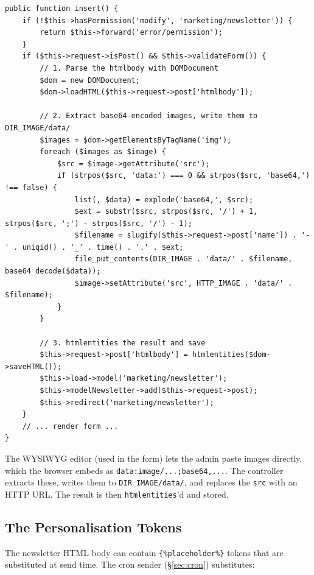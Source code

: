 \documentclass[11pt,a4paper]{article}
\begin{document}
\begin{lstlisting}[caption={\texttt{ControllerMarketingNewsletter::insert()} --- newsletter creation with base64 image extraction (abridged).},label={lst:newsletter-insert}]
public function insert() {
    if (!$this->hasPermission('modify', 'marketing/newsletter')) {
        return $this->forward('error/permission');
    }
    if ($this->request->isPost() && $this->validateForm()) {
        // 1. Parse the htmlbody with DOMDocument
        $dom = new DOMDocument;
        $dom->loadHTML($this->request->post['htmlbody']);

        // 2. Extract base64-encoded images, write them to DIR_IMAGE/data/
        $images = $dom->getElementsByTagName('img');
        foreach ($images as $image) {
            $src = $image->getAttribute('src');
            if (strpos($src, 'data:') === 0 && strpos($src, 'base64,') !== false) {
                list(, $data) = explode('base64,', $src);
                $ext = substr($src, strpos($src, '/') + 1, strpos($src, ';') - strpos($src, '/') - 1);
                $filename = slugify($this->request->post['name']) . '-' . uniqid() . '_' . time() . '.' . $ext;
                file_put_contents(DIR_IMAGE . 'data/' . $filename, base64_decode($data));
                $image->setAttribute('src', HTTP_IMAGE . 'data/' . $filename);
            }
        }

        // 3. htmlentities the result and save
        $this->request->post['htmlbody'] = htmlentities($dom->saveHTML());
        $this->load->model('marketing/newsletter');
        $this->modelNewsletter->add($this->request->post);
        $this->redirect('marketing/newsletter');
    }
    // ... render form ...
}
\end{lstlisting}

The WYSIWYG editor (used in the form) lets the admin paste images
directly, which the browser embeds as \texttt{data:image/...;base64,...}.
The controller extracts these, writes them to
\texttt{DIR\_IMAGE/data/}, and replaces the \texttt{src} with an
HTTP URL. The result is then \texttt{htmlentities}'d and stored.

\subsection{The Personalisation Tokens}

The newsletter HTML body can contain \texttt{\{\%placeholder\%\}}
tokens that are substituted at send time. The cron sender
(\S\ref{sec:cron}) substitutes:
\end{document}
